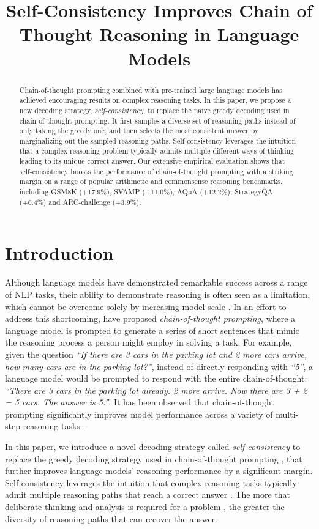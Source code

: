\title{Self-Consistency Improves Chain of Thought Reasoning in Language Models}

\begin{abstract}
Chain-of-thought prompting combined with pre-trained large language models has achieved encouraging results on complex reasoning tasks. In this paper, we propose a new decoding strategy, \emph{self-consistency}, to replace the naive greedy decoding used in chain-of-thought prompting. It first samples a diverse set of reasoning paths instead of only taking the greedy one, and then selects the most consistent answer by marginalizing out the sampled reasoning paths. Self-consistency leverages the intuition that a complex reasoning problem typically admits multiple different ways of thinking leading to its unique correct answer.  Our extensive empirical evaluation shows that self-consistency boosts the performance of chain-of-thought prompting with a striking margin on a range of popular arithmetic and commonsense reasoning benchmarks, including GSM8K (+17.9\%), SVAMP (+11.0\%), AQuA (+12.2\%), StrategyQA (+6.4\%) and ARC-challenge (+3.9\%).
\end{abstract}

\section{Introduction}

Although language models have demonstrated remarkable success across a range of NLP tasks, their ability to demonstrate reasoning is often seen as a limitation, which cannot be overcome solely by increasing model scale \citep[][\textit{inter alia}]{rae2021scaling,bigbench}. In an effort to address this shortcoming, \citet{wei2022chain} have proposed \textit{chain-of-thought prompting}, where a language model is prompted to generate a series of short sentences that mimic the reasoning process a person might employ in solving a task. For example, given the question \textit{``If there are 3 cars in the parking lot and 2 more cars arrive, how many cars are in the parking lot?''}, instead of directly responding with \textit{``5''},
a language model would be prompted to respond with the entire chain-of-thought: \textit{``There are 3 cars in the parking lot already. 2 more arrive. Now there are 3 + 2 = 5 cars. The answer is 5.''}. It has been observed that chain-of-thought prompting significantly improves model performance across a variety of multi-step reasoning tasks \citep{wei2022chain}.

In this paper, we introduce a novel decoding strategy called \textit{self-consistency} to replace the greedy decoding strategy used in chain-of-thought prompting \citep{wei2022chain}, that further improves language models' reasoning performance by a significant margin. Self-consistency leverages the intuition that complex reasoning tasks typically admit multiple reasoning paths that reach a correct answer \citep{stanovich2000individual}. The more that deliberate thinking and analysis is required for a problem \citep{evans2010intuition}, the greater the diversity of reasoning paths that can recover the answer.

